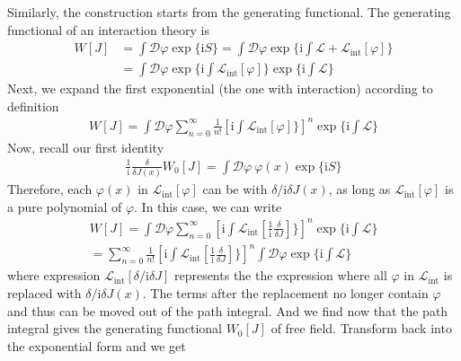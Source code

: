 \documentclass[letterpaper,10pt,english]{sphinxmanual}
\begin{document}
Similarly, the construction starts from the generating functional. The generating functional of an interaction theory is
\begin{equation*}
\begin{split}W[J] &= \int\mathcal{D}\varphi\exp\{\mathrm iS\} = \int\mathcal{D}\varphi\exp\{\mathrm i\!\!\int\!\!\mathcal{L}\! + \!\mathcal{L}_{\text{int}}[\varphi]\}\\
&= \int\mathcal{D}\varphi\exp\{\mathrm i\!\!\int\!\!\mathcal{L}_{\text{int}}[\varphi]\}\exp\{\mathrm i\!\!\int\!\!\mathcal{L}\}\end{split}
\end{equation*}
Next, we expand the first exponential (the one with interaction) according to definition
\begin{equation*}
\begin{split}W[J] = \int\mathcal{D}\varphi\sum_{n=0}^\infty\frac{1}{n!}\left[\mathrm i\!\!\int\!\!\mathcal{L}_{\text{int}}[\varphi]\}\right]^n\exp\{\mathrm i\!\!\int\!\!\mathcal{L}\}\end{split}
\end{equation*}
Now, recall our first identity
\begin{equation*}
\begin{split}\frac{1}{\mathrm{i}}\frac{\delta}{\delta J(x)}W_0[J] = \int\mathcal{D}\varphi\ \varphi(x)\exp\{\mathrm{i}S\}\end{split}
\end{equation*}
Therefore, each \(\varphi(x)\) in \(\mathcal{L}_{\text{int}}[\varphi]\) can be  with \(\delta/\mathrm{i}\delta J(x)\), as long as \(\mathcal{L}_{\text{int}}[\varphi]\) is a pure polynomial of \(\varphi\). In this case, we can write
\begin{equation*}
\begin{split}W[J] = \int\mathcal{D}\varphi\sum_{n=0}^\infty\left[\mathrm i\!\!\int\!\!\mathcal{L}_{\text{int}}\!\!\left[\frac{1}{\mathrm{i}}\!\frac{\delta}{\delta J}\right]\}\right]^n\exp\{\mathrm i\!\!\int\!\!\mathcal{L}\}\\
= \sum_{n=0}^\infty\frac{1}{n!}\left[\mathrm i\!\!\int\!\!\mathcal{L}_{\text{int}}\!\!\left[\frac{1}{\mathrm{i}}\!\frac{\delta}{\delta J}\right]\}\right]^n\int\mathcal{D}\varphi\exp\{\mathrm i\!\!\int\!\!\mathcal{L}\}\end{split}
\end{equation*}
where expression \(\mathcal{L}_{\text{int}}\!\!\left[\delta/\mathrm{i}\delta J\right]\) represents the the expression where all \(\varphi\) in \(\mathcal{L}_{\text{int}}\) is replaced with \(\delta/\mathrm{i}\delta J(x)\). The terms after the replacement no longer contain \(\varphi\) and thus can be moved out of the path integral. And we find now that the path integral gives the generating functional \(W_0[J]\) of free field. Transform back into the exponential form and we get
\end{document}
